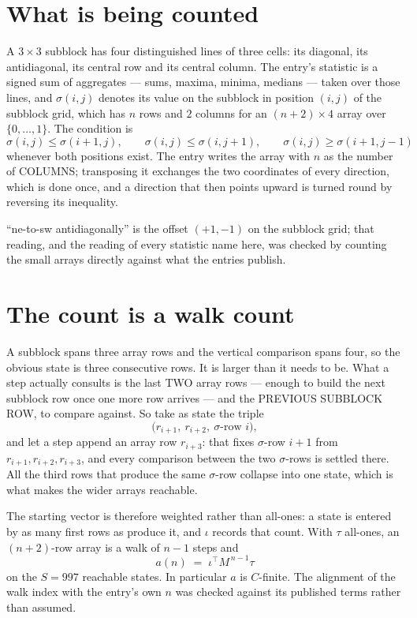 \documentclass[11pt,a4paper]{article}
\theoremstyle{plain}
\theoremstyle{definition}
\begin{document}
\section{What is being counted}

A $3\times3$ subblock has four distinguished lines of three cells: its diagonal, its
antidiagonal, its central row and its central column. The entry's statistic is a signed sum of
aggregates --- sums, maxima, minima, medians --- taken over those lines, and $\sigma(i,j)$
denotes its value on the subblock in position $(i,j)$ of the subblock grid, which has $n$ rows
and $2$ columns for an $(n+2)\times4$ array over $\{0,\dots,1\}$. The condition is
\[
\sigma(i,j)\le\sigma(i+1,j),\qquad \sigma(i,j)\le\sigma(i,j+1),\qquad \sigma(i,j)\ge\sigma(i+1,j-1)
\]
whenever both positions exist. The entry writes the array with $n$ as the number of COLUMNS; transposing it exchanges the two coordinates of every direction, which is done once, and a direction that then points upward is turned round by reversing its inequality.

``ne-to-sw antidiagonally'' is the offset $(+1,-1)$ on the subblock grid; that reading, and
the reading of every statistic name here, was checked by counting the small arrays directly
against what the entries publish.

\section{The count is a walk count}

A subblock spans three array rows and the vertical comparison spans four, so the obvious state
is three consecutive rows. It is larger than it needs to be. What a step actually consults is
the last TWO array rows --- enough to build the next subblock row once one more row arrives ---
and the PREVIOUS SUBBLOCK ROW, to compare against. So take as state the triple
\[
\bigl(r_{i+1},\ r_{i+2},\ \sigma\text{-row }i\bigr),
\]
and let a step append an array row $r_{i+3}$: that fixes $\sigma$-row $i+1$ from
$r_{i+1},r_{i+2},r_{i+3}$, and every comparison between the two $\sigma$-rows is settled
there. All the third rows that produce the same $\sigma$-row collapse into one state, which is
what makes the wider arrays reachable.

The starting vector is therefore weighted rather than all-ones: a state is entered by as many
first rows as produce it, and $\iota$ records that count. With $\tau$ all-ones, an
$(n+2)$-row array is a walk of $n-1$ steps and
\[
a(n)\;=\;\iota^{\!\top}M^{\,n-1}\tau
\]
on the $S=997$ reachable states. In particular $a$ is $C$-finite. The alignment of the walk
index with the entry's own $n$ was checked against its published terms rather than assumed.
\end{document}
